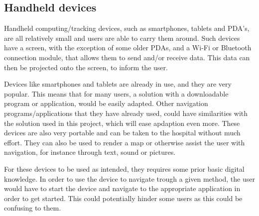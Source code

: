 	 
 	 

\subsection{Handheld devices} %
\label{sub:device}

 	 
Handheld computing/tracking devices, such as smartphones, tablets and PDA's, are all relatively small and users are able to carry them around. Such devices have a screen, with the exception of some older PDAs, and a Wi-Fi or Bluetooth connection module, that allows them to send and/or receive data. This data can then be projected onto the screen, to inform the user.

Devices like smartphones and tablets are already in use, and they are very popular. This means that for many users, a solution with a downloadable program or application, would be easily adapted. Other navigation programs/applications that they have already used, could have similarities with the solution used in this project, which will ease apdaption even more. These devices are also very portable and can be taken to the hospital without much effort. They can also be used to render a map or otherwise assist the user with navigation, for instance through text, sound or pictures.

For these devices to be used as intended, they requires some prior basic digital knowledge. In order to use the device to navigate trough a given method, the user would have to start the device and navigate to the appropriate application in order to get started. This could potentially hinder some users as this could be confusing to them.

